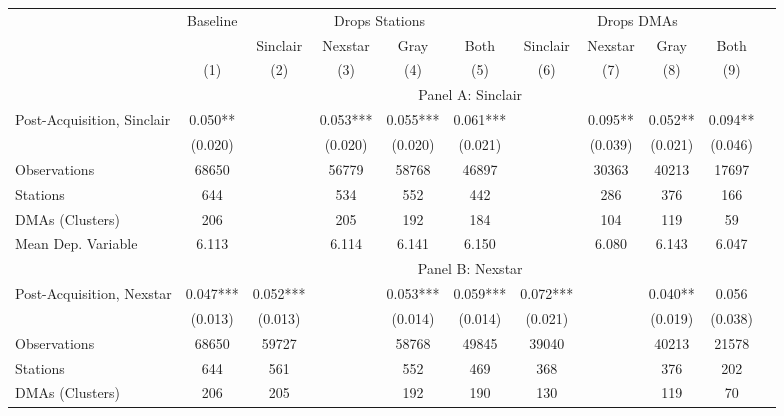 {\def \sym#1{\ifmmode^{#1}\else\(^{#1}\)\fi} \begin{tabular}{l*{10}{c}} \toprule \ & \multicolumn{1}{c}{Baseline} & \multicolumn{4}{c}{Drops Stations}   & \multicolumn{4}{c}{Drops DMAs} \\ \cmidrule(lr){2-2}\cmidrule(lr){3-6}\cmidrule(lr){7-10} \ & 
 & Sinclair & Nexstar & Gray & Both & Sinclair & Nexstar & Gray & Both \\  \ & (1) & (2) & (3) & (4) & (5) & (6)  & (7)  & (8)  & (9) \\
\midrule \ & \multicolumn{9}{c}{Panel A: Sinclair} \\\cmidrule(lr){2-10}
Post-Acquisition, Sinclair&    0.050** &         &    0.053***&    0.055***&    0.061***&         &    0.095** &    0.052** &    0.094** \\
                &  (0.020)   &         &  (0.020)   &  (0.020)   &  (0.021)   &         &  (0.039)   &  (0.021)   &  (0.046)   \\
\midrule
Observations    &    68650   &         &    56779   &    58768   &    46897   &         &    30363   &    40213   &    17697   \\
Stations        &      644   &         &      534   &      552   &      442   &         &      286   &      376   &      166   \\
DMAs (Clusters) &      206   &         &      205   &      192   &      184   &         &      104   &      119   &       59   \\
Mean Dep. Variable&    6.113   &         &    6.114   &    6.141   &    6.150   &         &    6.080   &    6.143   &    6.047   \\
\midrule \ & \multicolumn{9}{c}{Panel B: Nexstar} \\\cmidrule(lr){2-10}
Post-Acquisition, Nexstar&    0.047***&    0.052***&         &    0.053***&    0.059***&    0.072***&         &    0.040** &    0.056   \\
                &  (0.013)   &  (0.013)   &         &  (0.014)   &  (0.014)   &  (0.021)   &         &  (0.019)   &  (0.038)   \\
\midrule
Observations    &    68650   &    59727   &         &    58768   &    49845   &    39040   &         &    40213   &    21578   \\
Stations        &      644   &      561   &         &      552   &      469   &      368   &         &      376   &      202   \\
DMAs (Clusters) &      206   &      205   &         &      192   &      190   &      130   &         &      119   &       70   \\

\end{tabular}}
